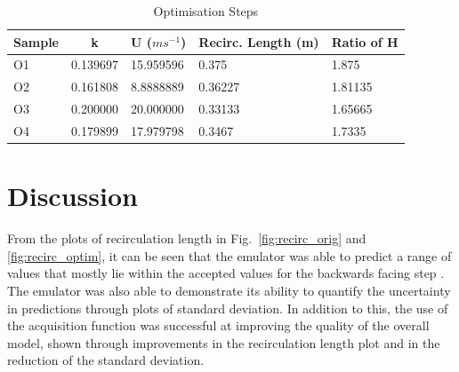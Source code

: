 \documentclass[conference]{IEEEtran}
\begin{document}
\begin{table}[ht]
\centering
\caption{Optimisation Steps}
\begin{tabular}{|l|ll|ll|}
\hline
\multicolumn{1}{|c|}{Sample} & \multicolumn{1}{c}{k} & \multicolumn{1}{c|}{U ($ms^{-1}$)} & \multicolumn{1}{c}{Recirc. Length (m)} & \multicolumn{1}{c|}{Ratio of H} \\ \hline
O1                           & 0.139697            & 15.959596                      & 0.375                                  & 1.875                           \\
O2                           & 0.161808           & 8.8888889                      & 0.36227                                & 1.81135                         \\
O3                           & 0.200000                  & 20.000000                               & 0.33133                                & 1.65665                         \\
O4                           & 0.179899            & 17.979798                      & 0.3467                                 & 1.7335                          \\ \hline
\end{tabular}
\label{tab:optim_values}
\end{table}


\section{Discussion}

From the plots of recirculation length in Fig.~\ref{fig:recirc_orig} and \ref{fig:recirc_optim}, it can be seen that the emulator was able to predict a range of values that mostly lie within the accepted values for the backwards facing step \cite{chen_review_2018}. The emulator was also able to demonstrate its ability to quantify the uncertainty in predictions through plots of standard deviation. In addition to this, the use of the acquisition function was successful at improving the quality of the overall model, shown through improvements in the recirculation length plot and in the reduction of the standard deviation.
\end{document}
